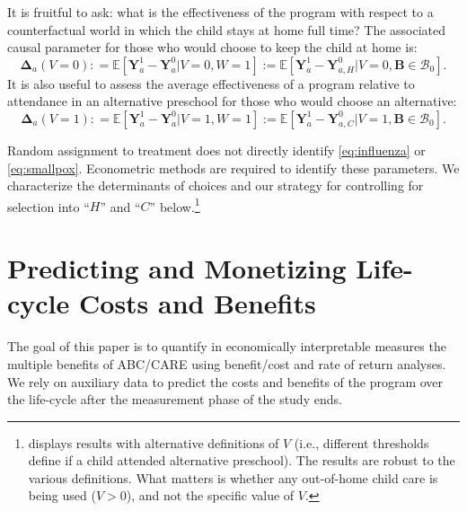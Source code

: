 It is fruitful to ask: what is the effectiveness of the program with respect to a counterfactual world in which the child stays at home full time? The associated causal parameter for those who would choose to keep the child at home is:
\begin{equation}\label{eq:influenza}
\bm{\Delta}_a \left(V = 0 \right) : =   \mathbb{E} \left[ \bm{Y}^1_a - \bm{Y}^0_a | V = 0, W = 1 \right] := \mathbb{E} \left[\bm{Y}^1_{a} - \bm{Y}^0_{a,H} | V = 0, \bm{B} \in \mathcal{B}_0 \right].
\end{equation}
It is also useful to assess the average effectiveness of a program relative to attendance in an alternative preschool for those who would choose an alternative:
\begin{equation}\label{eq:smallpox}
\bm{\Delta}_a \left( V =1 \right) : =   \mathbb{E} \left[ \bm{Y}^1_a - \bm{Y}^0_a | V = 1, W = 1 \right] := \mathbb{E} \left[\bm{Y}^1_a - \bm{Y}^0_{a,C} | V = 1, \bm{B} \in \mathcal{B}_0 \right].
\end{equation}

Random assignment to treatment does not directly identify \eqref{eq:influenza} or \eqref{eq:smallpox}. Econometric methods are required to identify these parameters. We characterize the determinants of choices and our strategy for controlling for selection into ``$H$'' and ``$C$'' below.\footnote{\cite{Garcia_Ziff_2017_Gender-Diff_UNPUBLISHED} displays results with alternative definitions of $V$ (i.e., different thresholds define if a child attended alternative preschool). The results are robust to the various definitions. What matters is whether any out-of-home child care is being used ($V>0$), and not the specific value of $V$.}

\section{Predicting and Monetizing Life-cycle Costs and Benefits}\label{section:cbamethodology}

The goal of this paper is to quantify in economically interpretable measures the multiple benefits of ABC/CARE using benefit/cost and rate of return analyses. We rely on auxiliary data to predict the costs and benefits of the program over the life-cycle after the measurement phase of the study ends.

